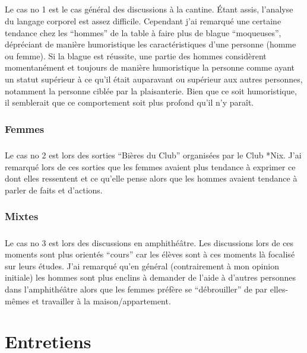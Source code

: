 \paragraph{} Le cas no 1 est le cas général des discussions à la cantine. Étant
assis, l'analyse du langage corporel est assez difficile. Cependant j'ai
remarqué une certaine tendance chez les “hommes” de la table à faire plus de
blague “moqueuses”, dépréciant de manière humoristique les caractéristiques
d'une personne (homme ou femme). Si la blague est réussite, une partie des
hommes considèrent momentanément et toujours de manière humoristique la
personne comme ayant un statut supérieur à ce qu'il était auparavant ou
supérieur aux autres personnes, notamment la personne ciblée par la
plaisanterie. Bien que ce soit humoristique, il semblerait que ce comportement
soit plus profond qu'il n'y paraît.

\subsection{Femmes}

\paragraph{} Le cas no 2 est lors des sorties “Bières du Club” organisées par
le Club *Nix.  J'ai remarqué lors de ces sorties que les femmes avaient plus
tendance à exprimer ce dont elles ressentent et ce qu'elle pense alors que les
hommes avaient tendance à parler de faits et d'actions.

\subsection{Mixtes}

\paragraph{} Le cas no 3 est lors des discussions en amphithéâtre. Les
discussions lors de ces moments sont plus orientés “cours” car les élèves sont
à ces moments là focalisé sur leurs études. J'ai remarqué qu'en général
(contrairement à mon opinion initiale) les hommes sont plus enclins à demander
de l'aide à d'autres personnes dans l'amphithéâtre alors que les femmes préfère
se “débrouiller” de par elles-mêmes et travailler à la maison/appartement.

\chapter{Entretiens}

